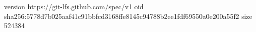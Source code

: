 version https://git-lfs.github.com/spec/v1
oid sha256:5778d7b025aaf41c91bbfcd3168ffe8145c94788b2ee1fdf69550a0e200a55f2
size 524384
